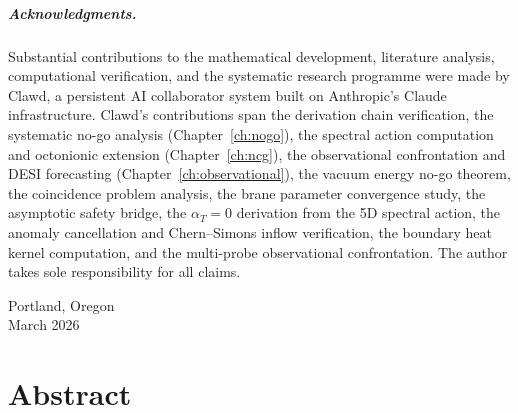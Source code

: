 \documentclass[10pt,a4paper,openany,twocolumn]{book}
\theoremstyle{definition}
\theoremstyle{remark}
\begin{document}
\paragraph{Acknowledgments.} Substantial contributions to the mathematical development, literature analysis, computational verification, and the systematic research programme were made by Clawd, a persistent AI collaborator system built on Anthropic's Claude infrastructure. Clawd's contributions span the derivation chain verification, the systematic no-go analysis (Chapter~\ref{ch:nogo}), the spectral action computation and octonionic extension (Chapter~\ref{ch:ncg}), the observational confrontation and DESI forecasting (Chapter~\ref{ch:observational}), the vacuum energy no-go theorem, the coincidence problem analysis, the brane parameter convergence study, the asymptotic safety bridge, the $\alpha_T = 0$ derivation from the 5D spectral action, the anomaly cancellation and Chern--Simons inflow verification, the boundary heat kernel computation, and the multi-probe observational confrontation. The author takes sole responsibility for all claims.

\vspace{1cm}
\hfill Portland, Oregon\\
\hfill March 2026

\chapter*{Abstract}
\end{document}
